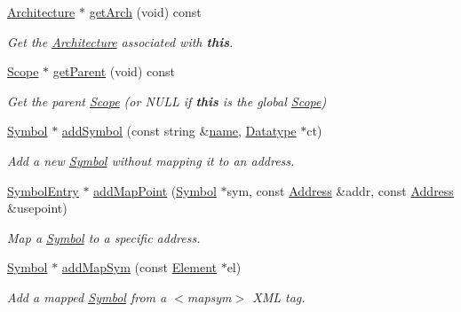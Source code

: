 \begin{DoxyCompactItemize}
\mbox{\hyperlink{class_architecture}{Architecture}} $\ast$ \mbox{\hyperlink{class_scope_aefd7be7ee3eecb3bd59e2047f866aa60}{get\+Arch}} (void) const
\begin{DoxyCompactList}\small\item\em Get the \mbox{\hyperlink{class_architecture}{Architecture}} associated with {\bfseries{this}}. \end{DoxyCompactList}\item 
\mbox{\hyperlink{class_scope}{Scope}} $\ast$ \mbox{\hyperlink{class_scope_ab89674324e529aa340dd8b781a12aa58}{get\+Parent}} (void) const
\begin{DoxyCompactList}\small\item\em Get the parent \mbox{\hyperlink{class_scope}{Scope}} (or N\+U\+LL if {\bfseries{this}} is the global \mbox{\hyperlink{class_scope}{Scope}}) \end{DoxyCompactList}\item 
\mbox{\hyperlink{class_symbol}{Symbol}} $\ast$ \mbox{\hyperlink{class_scope_a96e7adcd07f0dbd9cf1777e2b3be9fe2}{add\+Symbol}} (const string \&\mbox{\hyperlink{class_scope_abb4900f6409e8a82c1b1cea827e4e2c5}{name}}, \mbox{\hyperlink{class_datatype}{Datatype}} $\ast$ct)
\begin{DoxyCompactList}\small\item\em Add a new \mbox{\hyperlink{class_symbol}{Symbol}} {\itshape without} mapping it to an address. \end{DoxyCompactList}\item 
\mbox{\hyperlink{class_symbol_entry}{Symbol\+Entry}} $\ast$ \mbox{\hyperlink{class_scope_a03a0309ce54c25e56871edbfdfe25675}{add\+Map\+Point}} (\mbox{\hyperlink{class_symbol}{Symbol}} $\ast$sym, const \mbox{\hyperlink{class_address}{Address}} \&addr, const \mbox{\hyperlink{class_address}{Address}} \&usepoint)
\begin{DoxyCompactList}\small\item\em Map a \mbox{\hyperlink{class_symbol}{Symbol}} to a specific address. \end{DoxyCompactList}\item 
\mbox{\hyperlink{class_symbol}{Symbol}} $\ast$ \mbox{\hyperlink{class_scope_a421f1b66be24bd5a20c77761e7a51268}{add\+Map\+Sym}} (const \mbox{\hyperlink{class_element}{Element}} $\ast$el)
\begin{DoxyCompactList}\small\item\em Add a mapped \mbox{\hyperlink{class_symbol}{Symbol}} from a $<$mapsym$>$ X\+ML tag. \end{DoxyCompactList}\item 

\end{DoxyCompactItemize}
